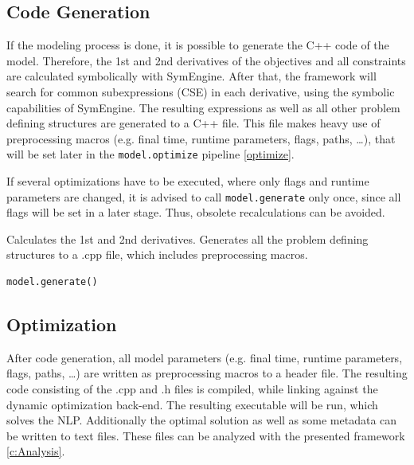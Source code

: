 \documentclass[12pt]{article}
\begin{document}
\subsection{Code Generation}

If the modeling process is done, it is possible to generate the C++ code of the
model.
Therefore, the 1st and 2nd derivatives of the objectives and all constraints
are calculated symbolically with SymEngine. After that, the framework will
search for common subexpressions (CSE) in each derivative, using the symbolic
capabilities of SymEngine. The resulting expressions as well as all other
problem defining structures are generated to a C++ file. This file makes heavy
use of preprocessing macros (e.g. final time, runtime parameters, flags, paths,
\ldots), that will be set later in the \texttt{model.optimize} pipeline
\eqref{optimize}.

If several optimizations have to be executed, where only flags and runtime
parameters are changed, it is advised to call \texttt{model.generate} only
once, since all flags will be set in a later stage. Thus, obsolete
recalculations can be avoided.

\begin{mdframed}[backgroundcolor=gray!10, roundcorner=10pt,
		linewidth=1pt]

	Calculates the 1st and 2nd derivatives. Generates all the problem
	defining structures to a .cpp file, which includes preprocessing macros.

	\begin{lstlisting}
model.generate()
\end{lstlisting}

\end{mdframed}

\subsection{Optimization}

After code generation, all model parameters (e.g. final time, runtime
parameters, flags, paths, \ldots) are written as preprocessing macros to a
header file. The resulting code consisting of the .cpp and .h files is
compiled, while linking against the dynamic optimization back-end. The resulting
executable will be run, which solves the NLP. Additionally the optimal solution
as well as some metadata can be written to text files. These files can be
analyzed with the presented framework \eqref{c:Analysis}.
\end{document}
